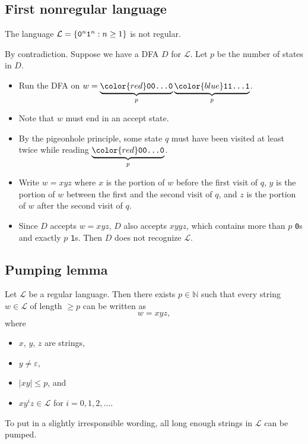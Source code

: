 \documentclass{notes}
\begin{document}
\subsection{First nonregular language}

\begin{thm}
  The language $\mathcal L = \left \{ \verb~0~^n \verb~1~^n : n \geq 1 \right \}$ is not regular.
\end{thm}

\begin{prf}
  By contradiction.
  Suppose we have a DFA $D$ for $\mathcal L$.
  Let $p$ be the number of states in $D$.
  
  \begin{itemize}
    \item Run the DFA on $w = \underbrace{\color{red} \verb~00...0~}_{p} \underbrace{\color{blue} \verb~11...1~}_{p}$.
      
    \item Note that $w$ must end in an accept state.

    \item By the pigeonhole principle, some state $q$ must have been visited at least twice while reading $\underbrace{\color{red} \verb~00...0~}_{p}$.
      
    \item Write $w = x y z$ where $x$ is the portion of $w$ before the first visit of $q$, $y$ is the portion of $w$ between the first and the second visit of $q$, and $z$ is the portion of $w$ after the second visit of $q$.
      
    \item Since $D$ accepts $w = x y z$, $D$ also accepts $x y y z$, which contains more than $p$ \verb~0~s and exactly $p$ \verb~1~s.
    Then $D$ does not recognize $\mathcal L$.
  \end{itemize}
\end{prf}

\subsection{Pumping lemma}

\begin{lem}
  Let $\mathcal L$ be a regular language.
  Then there exists $p \in \mathbb N$ such that every string $w \in \mathcal L$ of length $\geq p$ can be written as 
  \[
    w = x y z, 
  \]
  where
  \begin{itemize}
    \item $x$, $y$, $z$ are strings, 

    \item $y \neq \varepsilon$, 

    \item $\left | x y \right | \leq p$, and 

    \item $x y^i z \in \mathcal L$ for $i = 0, 1, 2, \dots$.
  \end{itemize}
  
  To put in a slightly irresponsible wording, all long enough strings in $\mathcal L$ can be pumped.
\end{lem}
\end{document}
